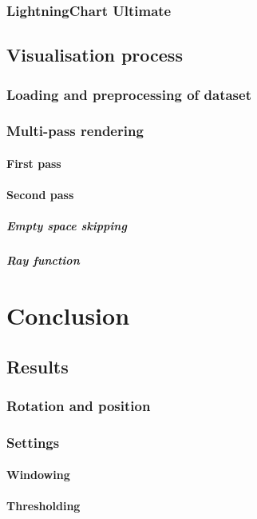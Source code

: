 \documentclass[english, 11pt]{report}
\begin{document}
\subsection{LightningChart Ultimate}
\section{Visualisation process}
\subsection{Loading and preprocessing of dataset}
\subsection{Multi-pass rendering}
\subsubsection{First pass}
\subsubsection{Second pass}
\paragraph{Empty space skipping}
\paragraph{Ray function}

\chapter{Conclusion}
\section{Results}
\subsection{Rotation and position}
\subsection{Settings}
\subsubsection{Windowing}
\subsubsection{Thresholding}
\end{document}
